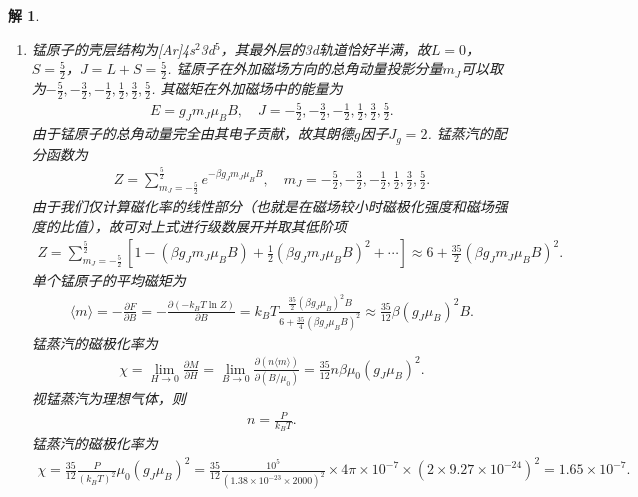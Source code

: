 \documentclass[UTF8,10pt,a4paper]{article}
\theoremstyle{Problem}
\theoremstyle{Solution}
\newtheorem*{sol}{解}
\begin{document}
\begin{sol}
    \begin{enumerate}
        \item[(a)] 锰原子的壳层结构为[Ar]4s$^2$3d$^5$，其最外层的3d轨道恰好半满，故$L=0$，$S=\frac{5}{2}$，$J=L+S=\frac{5}{2}$. 锰原子在外加磁场方向的总角动量投影分量$m_J$可以取为$-\frac{5}{2},-\frac{3}{2},-\frac{1}{2},\frac{1}{2},\frac{3}{2},\frac{5}{2}$. 其磁矩在外加磁场中的能量为
        \begin{align}
            E=g_Jm_J\mu_BB,\quad J=-\frac{5}{2},-\frac{3}{2},-\frac{1}{2},\frac{1}{2},\frac{3}{2},\frac{5}{2}.
        \end{align}
        由于锰原子的总角动量完全由其电子贡献，故其朗德$g$因子$J_g=2$. 锰蒸汽的配分函数为
        \begin{align}
            Z=\sum_{m_J=-\frac{5}{2}}^{\frac{5}{2}}e^{-\beta g_Jm_J\mu_BB},\quad m_J=-\frac{5}{2},-\frac{3}{2},-\frac{1}{2},\frac{1}{2},\frac{3}{2},\frac{5}{2}.
        \end{align}
        由于我们仅计算磁化率的线性部分（也就是在磁场较小时磁极化强度和磁场强度的比值），故可对上式进行级数展开并取其低阶项
        \begin{align}
            Z=\sum_{m_J=-\frac{5}{2}}^{\frac{5}{2}}\left[1-(\beta g_Jm_J\mu_BB)+\frac{1}{2}(\beta g_Jm_J\mu_BB)^2+\cdots\right]\approx 6+\frac{35}{2}(\beta g_Jm_J\mu_BB)^2.
        \end{align}
        单个锰原子的平均磁矩为
        \begin{align}
            \langle m\rangle=-\frac{\partial F}{\partial B}=-\frac{\partial(-k_BT\ln Z)}{\partial B}=k_BT\frac{\frac{35}{2}(\beta g_J\mu_B)^2B}{6+\frac{35}{4}(\beta g_J\mu_BB)^2}\approx\frac{35}{12}\beta(g_J\mu_B)^2B.
        \end{align}
        锰蒸汽的磁极化率为
        \begin{align}
            \chi=\lim_{H\rightarrow 0}\frac{\partial M}{\partial H}=\lim_{B\rightarrow 0}\frac{\partial(n\langle m\rangle)}{\partial(B/\mu_0)}=\frac{35}{12}n\beta\mu_0(g_J\mu_B)^2.
        \end{align}
        视锰蒸汽为理想气体，则
        \begin{align}
            n=\frac{P}{k_BT}.
        \end{align}
        锰蒸汽的磁极化率为
        \begin{align}
            \chi=\frac{35}{12}\frac{P}{(k_BT)^2}\mu_0(g_J\mu_B)^2=\frac{35}{12}\frac{10^5}{(1.38\times 10^{-23}\times 2000)^2}\times 4\pi\times 10^{-7}\times(2\times 9.27\times 10^{-24})^2=1.65\times 10^{-7}.

\end{align}
\end{enumerate}
\end{sol}
\end{document}
